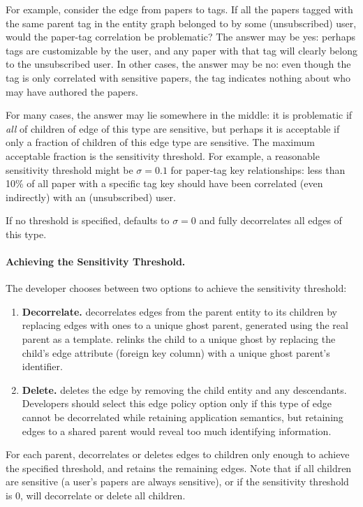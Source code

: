 For example, consider the edge from papers to tags. If all the papers tagged with the same parent
tag in the entity graph belonged to by some (unsubscribed) user, would the paper-tag correlation be
problematic? The answer may be yes: perhaps tags are customizable by the user, and any paper with
that tag will clearly belong to the unsubscribed user. In other cases, the answer may be no: even
though the tag is only correlated with sensitive papers, the tag indicates nothing about who may
have authored the papers.

For many cases, the answer may lie somewhere in the middle: it is problematic if \emph{all} of
children of edge of this type are sensitive, but perhaps it is acceptable if only a fraction of
children of this edge type are sensitive. The maximum acceptable fraction is the sensitivity
threshold. For example, a reasonable sensitivity threshold might be $\sigma = 0.1$ for paper-tag
key relationships: less than 10\% of all paper with a specific tag key should have been correlated
(even indirectly) with an (unsubscribed) user. 

If no threshold is specified, \sys defaults to $\sigma=0$ and fully
decorrelates all edges of this type. 

\paragraph{Achieving the Sensitivity Threshold.}
The developer chooses between two options to achieve the sensitivity threshold: 
\begin{enumerate}
    \item \textbf{Decorrelate.}
    \sys decorrelates edges from the parent entity to its children by 
    replacing edges with ones to a unique ghost parent, generated using the
    real parent as a template. \sys relinks the child to a unique ghost by replacing the child's edge
    attribute (foreign key column) with a unique ghost parent's identifier. 

\item \textbf{Delete.}
    \sys deletes the edge by removing the child entity and any descendants. Developers should select
    this edge policy option only if this type of edge cannot be decorrelated while retaining application
    semantics, but retaining edges to a shared parent would reveal too much identifying information.
\end{enumerate}

For each parent, \sys decorrelates or deletes edges to children only enough to achieve the specified
threshold, and retains the remaining edges. Note that if all children are sensitive (a user's papers
are always sensitive), or if the sensitivity threshold is 0, \sys will decorrelate or delete all
children. 

